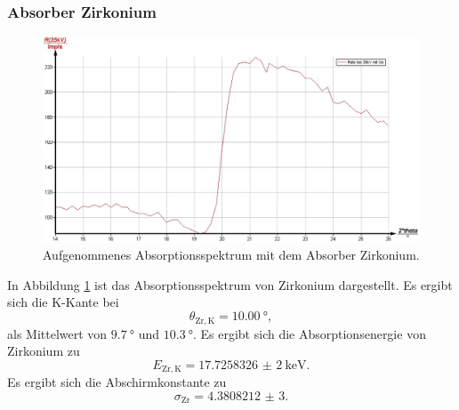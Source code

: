 \subsubsection{Absorber Zirkonium}
\begin{figure}
	\includegraphics[width=1.0\textwidth]{nIKO_und_jULIAN_ÜLADS/zirkonium.jpg}
	\caption{Aufgenommenes Absorptionsspektrum mit dem Absorber Zirkonium.}
	\label{fig:zirkonium_absorber}
\end{figure}
In Abbildung \ref{fig:zirkonium_absorber} ist das Absorptionsspektrum von Zirkonium 
dargestellt.
Es ergibt sich die K-Kante bei
\begin{equation*}
	\theta_{\mathrm{Zr,K}} = \SI{10,00}{\degree} \mathrm{,}
\end{equation*}
als Mittelwert von $\SI{9,7}{\degree}$ und $\SI{10,3}{\degree}$.
Es ergibt sich die Absorptionsenergie von Zirkonium zu
\begin{equation*}
	E_{\mathrm{Zr,K}} = \SI{17,7258326(2)}{\kilo\electronvolt} \mathrm{.}
\end{equation*}
Es ergibt sich die Abschirmkonstante zu
\begin{equation*}
	\sigma_{\mathrm{Zr}} = \num{4,3808212(3)} \mathrm{.}
\end{equation*}

\FloatBarrier
